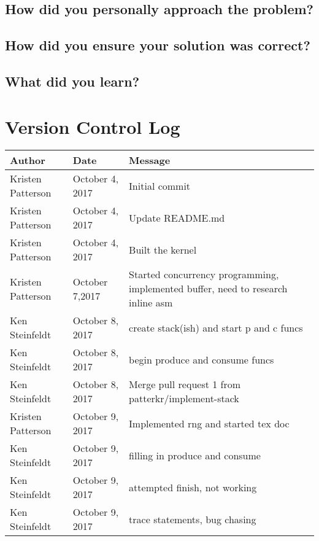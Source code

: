 \documentclass[10pt,letterpaper,onecolumn,draftclsnofoot]{IEEEtran}
\begin{document}
\subsection{How did you personally approach the problem?}

\subsection{How did you ensure your solution was correct?}

\subsection{What did you learn?}

\section{Version Control Log}

\begin{center}
	\begin{tabular}{|l|l|l|}
		\hline
		\textbf{Author} & \textbf{Date} & \textbf{Message} \\ \hline
		Kristen Patterson & October 4, 2017 & Initial commit \\ \hline
		Kristen Patterson & October 4, 2017 & Update README.md \\ \hline
		Kristen Patterson & October 4, 2017 & Built the kernel \\ \hline
		Kristen Patterson & October 7,2017 & Started concurrency programming, implemented buffer, need to research inline asm \\ \hline
		Ken Steinfeldt & October 8, 2017 & create stack(ish) and start p and c funcs \\ \hline
		Ken Steinfeldt & October 8, 2017 & begin produce and consume funcs \\ \hline
		Ken Steinfeldt & October 8, 2017 & Merge pull request 1 from patterkr/implement-stack \\ \hline
		Kristen Patterson & October 9, 2017 & Implemented rng and started tex doc \\ \hline
		Ken Steinfeldt & October 9, 2017 & filling in produce and consume \\ \hline
		Ken Steinfeldt & October 9, 2017 & attempted finish, not working \\ \hline
		Ken Steinfeldt & October 9, 2017 & trace statements, bug chasing \\ \hline
	\end{tabular}
\end{center}
\end{document}

